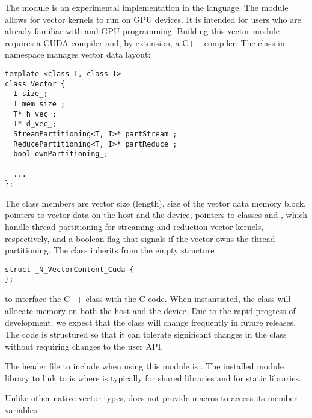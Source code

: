 %
The {\nveccuda} module is an experimental {\nvector} implementation in the {\cuda} language.
The module allows for {\sundials} vector kernels to run on GPU devices. It is intended for users
who are already familiar with {\cuda} and GPU programming. Building this vector 
module requires a CUDA compiler and, by extension, a C++ compiler. The class  
in namespace  manages vector data layout: 
\begin{verbatim} 
template <class T, class I>
class Vector {
  I size_;
  I mem_size_;
  T* h_vec_;
  T* d_vec_;
  StreamPartitioning<T, I>* partStream_;
  ReducePartitioning<T, I>* partReduce_;
  bool ownPartitioning_;
  
  ...
};
\end{verbatim}

The class members are vector size (length), size of the vector data memory block, pointers
to vector data on the host and the device, pointers to classes 
and , which handle thread partitioning for streaming and 
reduction vector kernels, respectively, and a boolean flag that signals if the
vector owns the thread partitioning. The class  inherits from the empty structure
\begin{verbatim} 
struct _N_VectorContent_Cuda {
};
\end{verbatim}
to interface the C++ class with the {\nvector} C code. When instantiated, the class
 will allocate memory on both the host and the device. Due to the rapid
progress of {\cuda} development, we expect that the 
class will change frequently in future {\sundials} releases. The code is
structured so that it can tolerate significant changes in the 
 class without requiring changes to the user API.


The header file to include when using this module is .
The installed module library to link to is
where  is typically  for shared libraries and 
for static libraries.

Unlike other native {\sundials} vector types, {\nveccuda} does not provide macros 
to access its member variables.

